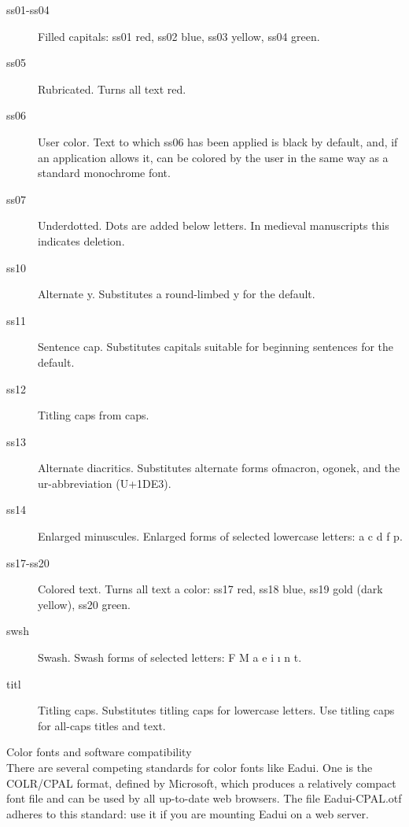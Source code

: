 \documentclass[11pt,letterpaper,twoside,openany]{book}
\begin{document}
{\begin{description}
  \item[\irsc ss01-ss04] Filled capitals: ss01 red, ss02 blue, ss03 yellow, ss04 green.

  \item[\irsc ss05] Rubricated. Turns all text red.

  \item[\irsc ss06] User color. Text to which ss06 has been applied is black by
  default, and, if an application allows it, can be colored by the user in the
  same way as a standard monochrome font.

  \item[\irsc ss07] Underdotted. Dots are added below letters. In medieval
  manuscripts this indicates deletion.

  \item[\irsc ss10] Alternate y. Substitutes a round-limbed y for the default.

  \item[\irsc ss11] Sentence cap. Substitutes capitals suitable for beginning sentences
  for the default.

  \item[\irsc ss12] Titling caps from caps.

  \item[\irsc ss13] Alternate diacritics. Substitutes alternate forms of\linebreak macron,
  ogonek, and the ur-abbreviation (U+1DE3).

  \item[\irsc ss14] Enlarged minuscules. Enlarged forms of selected lowercase letters:
  {\irit a c d f p}.

  \item[\irsc ss17-ss20] Colored text. Turns all text a color: ss17 red, ss18 blue,
  ss19 gold (dark yellow), ss20 green.

  \item[\irsc swsh] Swash. Swash forms of selected letters: {\irit F M a e i ı n t}.

  \item[\irsc titl] Titling caps. Substitutes titling caps for lowercase letters.
  Use titling caps for all-caps titles and text.

\end{description}
}

\newpage

\noindent Color fonts and software compatibility\\[1ex]

\noindent\normalsize\irrm There are several competing standards for color fonts like Eadui. One is
the COLR/CPAL format, defined by Microsoft, which produces a relatively compact font file
and can be used by all up-to-date web browsers. The file Eadui-CPAL.otf adheres to this
standard: use it if you are mounting Eadui on a web server.
\end{document}
